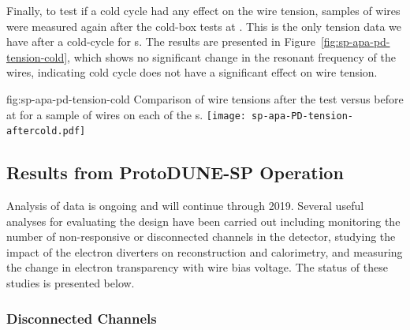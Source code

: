 Finally, to test if a cold cycle had any effect on the wire tension, samples of wires were measured again after the cold-box tests at . This is the only tension data we have after a cold-cycle for  s. The results are presented in Figure~\ref{fig:sp-apa-pd-tension-cold}, which shows no significant change in the resonant frequency of the wires, indicating cold cycle does not have a significant effect on wire tension.

\begin{dunefigure}{fig:sp-apa-pd-tension-cold}
{Comparison of wire tensions after the \coldbox test versus before at  for a sample of wires on each of the  s.}
\texttt{[image: sp-apa-PD-tension-aftercold.pdf]} 
\end{dunefigure}



\subsection{Results from ProtoDUNE-SP Operation}
\label{sec:fdsp-apa-qa-protodune-ops}


Analysis of  data is ongoing and will continue through 2019.  Several useful analyses for evaluating the  design have been carried out including monitoring the number of non-responsive or disconnected channels in the detector, studying the impact of the electron diverters on reconstruction and calorimetry, and measuring the change in electron transparency with wire bias voltage.  The status of these studies is presented below.   


\subsubsection{Disconnected Channels}
\label{sec:fdsp-apa-qa-protodune-ops-dead-channels}

